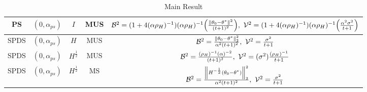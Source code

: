 \begin{table*}[t]
\begin{center}
{\begin{tabular}{|c|c|c|c|c|}
PS       & $(0,\alpha_{ps})$    &   $I$     & MUS        &   $\mathcal{B}^2=(1+4(\alpha\rho_H)^{-1}) (\alpha\rho_H)^{-1} \Big(\frac{\left\| \theta_0-\theta^*\right\|^2}{(t+1)^2}\Big),~\mathcal{V}^2=(1+4(\alpha\rho_H)^{-1}) (\alpha\rho_H)^{-1} \Big(\frac{\alpha^2\sigma^2}{t+1} \Big)$\\ \hline
SPDS    & $(0,\alpha_{ps})$     &   $H$     & MUS        &  $\mathcal{B}^2=\frac{\left\| \theta_0-\theta^*\right\|^2_2}{\alpha^2(t+1)^2},~\mathcal{V}^2=\frac{\sigma^2}{t+1}$\\ \hline
SPDS    & $(0,\alpha_{ps})$     &   $H^{\frac{1}{2}}$     & MUS        &   $\mathcal{B}^2=\frac{(\rho_H)^{-1}(\alpha)^{-2}}{(t+1)^2},~\mathcal{V}^2=(\sigma^2)\frac{(\rho_H)^{-1}}{t+1}$\\ \hline
SPDS    & $(0,\alpha_{ps})$     &   $H^{\frac{1}{2}}$     & MS        &   $\mathcal{B}^2=\frac{\left\| H^{-\frac{1}{2}}(\theta_0-\theta^*)\right\|^2_2}{\alpha^2(t+1)^2},~\mathcal{V}^2=\frac{\sigma^2}{t+1}$\\ \hline
\end{tabular}
}
\end{center}
\caption{Main Result}
\label{maintable}
\end{table*}
